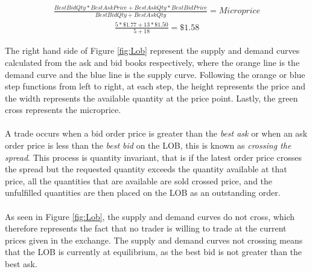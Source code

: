 \documentclass[ %
                    author={Ashwinder Khurana},
                supervisor={Prof Dave Cliff},
                    degree={MEng},
                     title={The Deeply Reinforced Trader},
                  subtitle={},
                      type={enterprise},
                      year={2020} ]{dissertation}
\begin{document}
\begin{equation}
\label{microprice}
\begin{split}
\frac{BestBidQty * BestAskPrice + BestAskQty*BestBidPrice}{ BestBidQty + BestAskQty}  = Microprice 
\end{split}
\end{equation}
\begin{equation}
\begin{split}
\frac{5*\$1.77 + 13*\$1.50}{5 + 18} = \$1.58
\end{split}
\end{equation}

\noindent
The right hand side of Figure \ref{fig:Lob} represent the supply and demand curves calculated from the ask and bid books respectively, where the orange line is the demand curve and the blue line is the supply curve.  Following the orange or blue step functions from left to right, at each step, the height represents the price and the width represents the available quantity at the price point. Lastly, the green cross represents the microprice.
\\
\\
A trade occurs when a bid order price is greater than the \textit{best ask} or when an ask order price is less than the \textit{best bid} on the LOB, this is known as \textit{crossing the spread}. This process is quantity invariant, that is if the latest order price crosses the spread but the requested quantity exceeds the quantity available at that price, all the quantities that are available are sold crossed price, and the unfulfilled quantities are then placed on the LOB as an outstanding order.
\\
\\
\noindent
As seen in Figure \ref{fig:Lob}, the supply and demand curves do not cross, which therefore represents the fact that no trader is willing to trade at the current prices given in the exchange. The supply and demand curves not crossing means that the LOB is currently at equilibrium, as the best bid is not greater than the best ask.
\end{document}
